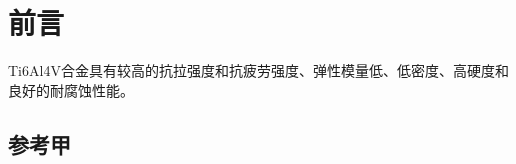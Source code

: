 \documentclass[
class = book,
zihao = -4,
font = noto,
paper = a4paper,
openany
]{easybook}
\newcommand{\ti}{Ti6Al4V}
\begin{document}
	\maketitle
	\frontmatter*[roman]

	\begin{abstract}
		\ti 合金又名TC4合金，拥有较好的塑韧性、耐热性、成形性、耐蚀性等，
		在机械、军事、航空航天等领域获得了极为广泛的应用。但TC4合金仍存在硬度较低、摩擦磨损系数高、耐磨性能差、较低的塑韧性和力学性能上的各向异性等缺点，制约了其进一步的应用。本文旨在调研固溶时效处理Ti6Al4V合金强度的影响，并分析了不同固溶时效工艺参数下处理Ti6Al4V合金的力学性能，确定了最佳的固溶温度、时效温度、失效时间等参数，为工程应用提供了有价值的参考。
\\

	\end{abstract}

	\tableofcontents
	\mainmatter*

	\pagestyle{Xju}
	\newcommand{\hot}[9]{
					#1 & #2 & $\mathrm{#3}$ & #4 & #5 & $\mathrm{#6}$ & #7& #8 & #9 &
%
%
%
%
%
%
%
	}
	\chapter{前言}
Ti6Al4V合金具有较高的抗拉强度和抗疲劳强度、弹性模量低、低密度、高硬度和良好的耐腐蚀性能。

\section{参考甲}
\end{document}
